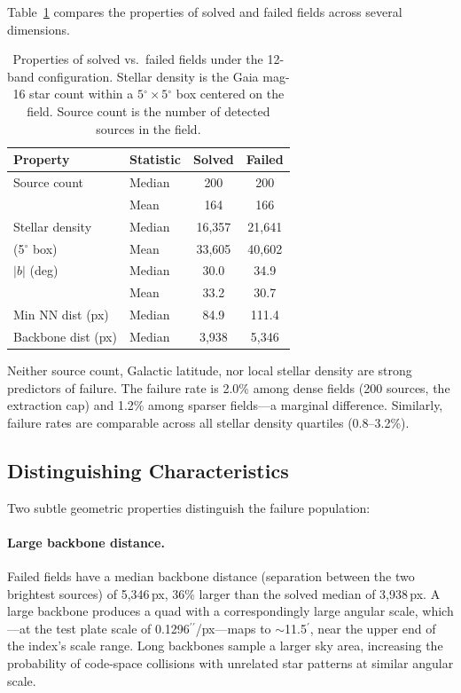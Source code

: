 \documentclass[twocolumn, 10pt]{article}
\newcommand{\arcsec}{\ensuremath{^{\prime\prime}}}
\newcommand{\arcmin}{\ensuremath{^{\prime}}}
\newcommand{\degr}{\ensuremath{^{\circ}}}
\begin{document}
Table~\ref{tab:failprops} compares the properties of solved and failed
fields across several dimensions.

\begin{table}[t]
\centering
\caption{Properties of solved vs.\ failed fields under the 12-band
configuration. Stellar density is the Gaia mag-16 star count within a
$5\degr \times 5\degr$ box centered on the field. Source count is the
number of detected sources in the field.
\label{tab:failprops}}
\begin{tabular}{llcc}
\toprule
Property & Statistic & Solved & Failed \\
\midrule
Source count & Median & 200 & 200 \\
             & Mean   & 164 & 166 \\
\midrule
Stellar density & Median & 16{,}357 & 21{,}641 \\
(5\degr{} box) & Mean & 33{,}605 & 40{,}602 \\
\midrule
$|b|$ (deg) & Median & 30.0 & 34.9 \\
            & Mean   & 33.2 & 30.7 \\
\midrule
Min NN dist (px) & Median & 84.9 & 111.4 \\
\midrule
Backbone dist (px) & Median & 3{,}938 & 5{,}346 \\
\bottomrule
\end{tabular}
\end{table}

Neither source count, Galactic latitude, nor local stellar density
are strong predictors of failure. The failure rate is 2.0\% among
dense fields (200 sources, the extraction cap) and 1.2\% among
sparser fields---a marginal difference. Similarly, failure rates are
comparable across all stellar density quartiles (0.8--3.2\%).

\subsection{Distinguishing Characteristics} \label{sec:distinguish}

Two subtle geometric properties distinguish the failure population:

\paragraph{Large backbone distance.}
Failed fields have a median backbone distance (separation between the
two brightest sources) of 5{,}346\,px, 36\% larger than the solved
median of 3{,}938\,px. A large backbone produces a quad with a
correspondingly large angular scale, which---at the test plate scale
of 0.1296\arcsec/px---maps to $\sim$11.5\arcmin, near the upper end
of the index's scale range. Long backbones sample a larger sky area,
increasing the probability of code-space collisions with unrelated
star patterns at similar angular scale.
\end{document}
